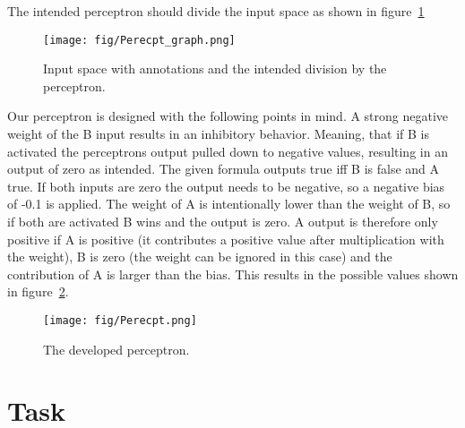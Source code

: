 \documentclass[a4paper, 11pt]{article}
\begin{document}
The intended perceptron should divide the input space as shown in figure~\ref{fig:perceptron_space}

\begin{figure}[h!]
    \centering
    \texttt{[image: fig/Perecpt\_graph.png]}
    \caption{Input space with annotations and the intended division by the perceptron.}
    \label{fig:perceptron_space}
\end{figure}

Our perceptron is designed with the following points in mind.
A strong negative weight of the B input results in an inhibitory behavior.
Meaning, that if B is activated the perceptrons output pulled down to negative values, resulting in an output of zero as intended.
The given formula outputs true iff B is false and A true.
If both inputs are zero the output needs to be negative, so a negative bias of -0.1 is applied.
The weight of A is intentionally lower than the weight of B, so if both are activated B wins and the output is zero.
A output is therefore only positive if A is positive (it contributes a positive value after multiplication with the weight), B is zero (the weight can be ignored in this case) and the contribution of A is larger than the bias.
This results in the possible values shown in figure~\ref{fig:perceptron}.

\begin{figure}[h!]
    \centering
    \texttt{[image: fig/Perecpt.png]}
    \caption{The developed perceptron.}
    \label{fig:perceptron}
\end{figure}

\newpage

\section{Task}
\end{document}
